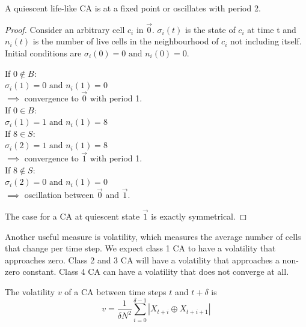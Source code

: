 \begin{lemma}
A quiescent life-like CA is at a fixed point or oscillates with period 2.   
\end{lemma}

\begin{proof} \label{quiescent-nullity}
Consider an arbitrary cell $c_i$ in $\vec{0}$. $\sigma_i(t)$ is the state of $c_i$ at time t and $n_i(t)$ is the number of live cells in the neighbourhood of $c_i$ not including itself. Initial conditions are $\sigma_i(0) = 0 \text{\ and\ } n_i(0) = 0$.
\begin{multicols}{2}
\noindent If $0 \notin B$:\\
\null \quad $\sigma_i(1) = 0 \text{\ and\ } n_i(1) = 0 $\\
\null \quad $\implies$ convergence to $\vec{0}$ with period 1.\\
\columnbreak\linebreak
\noindent If $0 \in B$:\\
\null \quad $\sigma_i(1) = 1 \text{\ and\ } n_i(1) = 8 $\\
\null \quad If $8 \in S$:\\
\null \qquad $\sigma_i(2) = 1 \text{\ and\ } n_i(1) = 8 $\\
\null \qquad $\implies$ convergence to $\vec{1}$ with period 1.\\
\null \quad If $8 \notin S$:\\
\null \qquad $\sigma_i(2) = 0 \text{\ and\ } n_i(1) = 0 $\\
\null \qquad $\implies$ oscillation between $\vec{0}$ and $\vec{1}$.
\end{multicols}
\noindent The case for a CA at quiescent state $\vec{1}$ is exactly symmetrical.
\end{proof}

Another useful measure is volatility, which measures the average number of cells that change per time step. We expect class 1 CA to have a volatility that approaches zero. Class 2 and 3 CA will have a volatility that approaches a non-zero constant. Class 4 CA can have a volatility that does not converge at all.\\

\begin{definition}[Volatility]
The volatility $v$ of a CA between time steps $t$ and $t + \delta$ is
\begin{equation}
    v = \frac{1}{\delta N^2} \sum_{i=0}^{\delta-1} \left| X_{t+i} \oplus X_{t+i+1} \right|
\end{equation}
\end{definition}

